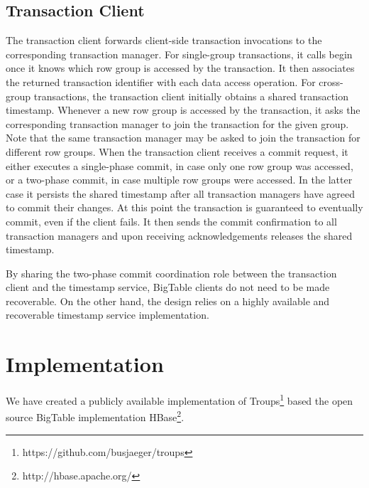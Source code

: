 \documentclass[10pt,final,journal]{IEEEtran}
\begin{document}
\subsection{Transaction Client}
The transaction client forwards client-side transaction invocations to the corresponding transaction manager. For single-group transactions, it calls begin once it knows which row group is accessed by the transaction. It then associates the returned transaction identifier with each data access operation. For cross-group transactions, the transaction client initially obtains a shared transaction timestamp. Whenever a new row group is accessed by the transaction, it asks the corresponding transaction manager to join the transaction for the given group. Note that the same transaction manager may be asked to join the transaction for different row groups. When the transaction client receives a commit request, it either executes a single-phase commit, in case only one row group was accessed, or a two-phase commit, in case multiple row groups were accessed. In the latter case it persists the shared timestamp after all transaction managers have agreed to commit their changes. At this point the transaction is guaranteed to eventually commit, even if the client fails. It then sends the commit confirmation to all transaction managers and upon receiving acknowledgements releases the shared timestamp.

By sharing the two-phase commit coordination role between the transaction client and the timestamp service, BigTable clients do not need to be made recoverable. On the other hand, the design relies on a highly available and recoverable timestamp service implementation.

\section{Implementation}
We have created a publicly available implementation of Troups\footnote{https://github.com/busjaeger/troups} based the open source BigTable implementation HBase\footnote{http://hbase.apache.org/}.
\end{document}

